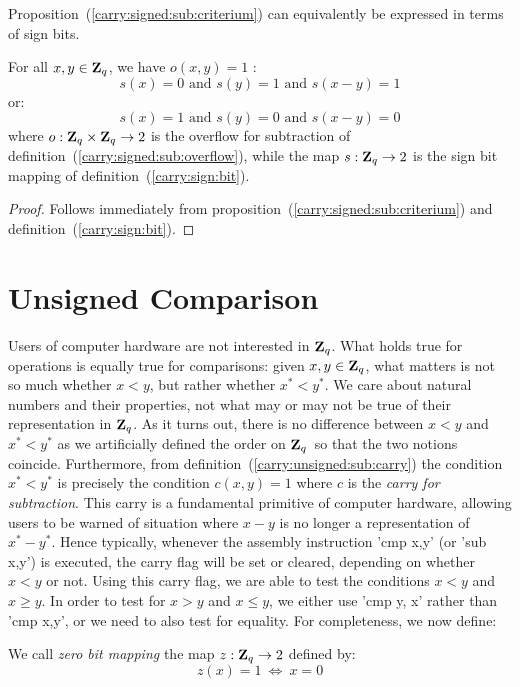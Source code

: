 \documentclass{article}
\newcommand{\zq}{\mbox{${\bf Z}_{q}$}}
\begin{document}
Proposition~(\ref{carry:signed:sub:criterium}) can equivalently be expressed
in terms of sign bits.
\begin{prop}\label{carry:signed:sub:criterium:2}
  For all $x,y\in\zq$, we have $o(x,y)=1$ \ifand:
  \[
    s(x)=0\mbox{\ and\ }s(y)=1\mbox{\ and\ }s(x-y)=1
  \]
or:
  \[
    s(x)=1\mbox{\ and\ }s(y)=0\mbox{\ and\ }s(x-y)=0
  \]
where $o:\zq\times\zq\rightarrow 2$ is the overflow for subtraction of 
  definition~(\ref{carry:signed:sub:overflow}), while the map $s:\zq\rightarrow 2$
  is the sign bit mapping of definition~(\ref{carry:sign:bit}).
\end{prop}
\begin{proof}
  Follows immediately from proposition~(\ref{carry:signed:sub:criterium})
  and definition~(\ref{carry:sign:bit}).
\end{proof}

\section{Unsigned Comparison}
Users of computer hardware are not interested in \zq. What holds true
for operations is equally true for comparisons: given $x,y\in\zq$, what
matters is not so much whether $x<y$, but rather whether $x^{*}<y^{*}$.
We care about natural numbers and their properties, not what may or
may not be true of their representation in \zq. As it turns out, there
is no difference between $x<y$ and $x^{*}<y^{*}$ as we artificially
defined the order on \zq\ so that the two notions coincide. Furthermore,
from definition~(\ref{carry:unsigned:sub:carry}) the condition 
$x^{*}<y^{*}$ is precisely the condition $c(x,y)=1$ where $c$ is 
the {\em carry for subtraction}. This carry is a fundamental primitive
of computer hardware, allowing users to be warned of situation where
$x-y$ is no longer a representation of $x^{*}-y^{*}$. Hence typically,
whenever the assembly instruction '{\rm cmp x,y}' (or '{\rm sub x,y}')
is executed, the carry flag will be set or cleared, depending on whether
$x<y$ or not. Using this carry flag, we are able to test the conditions
$x<y$ and $x\geq y$. In order to test for $x>y$ and $x\leq y$, we
either use '{\rm cmp y, x}' rather than '{\rm cmp x,y}', or we need
to also test for equality. For completeness, we now define:

\begin{defin}\label{carry:zero:bit}
  We call {\em zero bit mapping} the map $z:\zq\rightarrow 2$ defined by:
    \[
      z(x) = 1\ \Leftrightarrow\ x=0
    \]
\end{defin}
\end{document}
